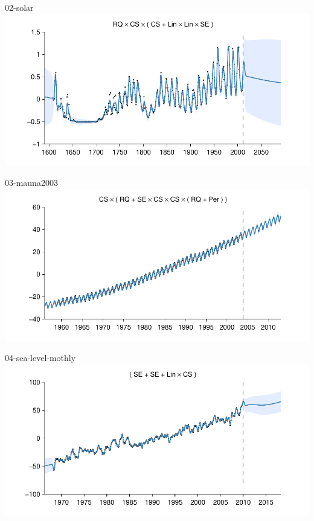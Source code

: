     
\begin{frame}{02-solar}
  \center
  \includegraphics[width=1.0\textwidth]{figures/02-solar/02-solar_all}
\end{frame}  


    
\begin{frame}{03-mauna2003}
  \center
  \includegraphics[width=1.0\textwidth]{figures/03-mauna2003/03-mauna2003_all}
\end{frame}  


    
\begin{frame}{04-sea-level-mothly}
  \center
  \includegraphics[width=1.0\textwidth]{figures/04-sea-level-mothly/04-sea-level-mothly_all}
\end{frame}  


